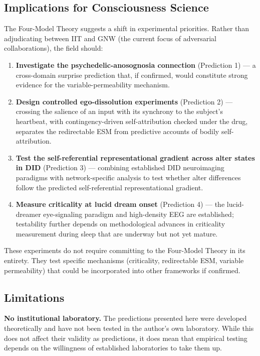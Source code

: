 \documentclass[12pt]{article}
\begin{document}
\subsection{Implications for Consciousness Science}


The Four-Model Theory suggests a shift in experimental priorities. Rather than adjudicating between IIT and GNW (the current focus of adversarial collaborations), the field should:

\begin{enumerate}
\item \textbf{Investigate the psychedelic-anosognosia connection} (Prediction 1) --- a cross-domain surprise prediction that, if confirmed, would constitute strong evidence for the variable-permeability mechanism.
\item \textbf{Design controlled ego-dissolution experiments} (Prediction 2) --- crossing the salience of an input with its synchrony to the subject's heartbeat, with contingency-driven self-attribution checked under the drug, separates the redirectable ESM from predictive accounts of bodily self-attribution.
\item \textbf{Test the self-referential representational gradient across alter states in DID} (Prediction 3) --- combining established DID neuroimaging paradigms with network-specific analysis to test whether alter differences follow the predicted self-referential representational gradient.
\item \textbf{Measure criticality at lucid dream onset} (Prediction 4) --- the lucid-dreamer eye-signaling paradigm and high-density EEG are established; testability further depends on methodological advances in criticality measurement during sleep that are underway but not yet mature.
\end{enumerate}

These experiments do not require committing to the Four-Model Theory in its entirety. They test specific mechanisms (criticality, redirectable ESM, variable permeability) that could be incorporated into other frameworks if confirmed.


\subsection{Limitations}


\textbf{No institutional laboratory.} The predictions presented here were developed theoretically and have not been tested in the author's own laboratory. While this does not affect their validity as predictions, it does mean that empirical testing depends on the willingness of established laboratories to take them up.
\end{document}
